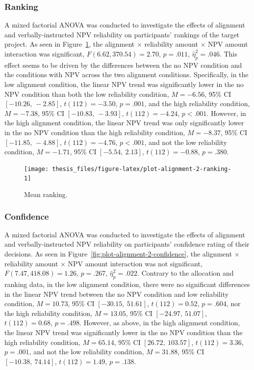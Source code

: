 \documentclass[a4paper, nobind, dvipsnames]{templates/ociamthesis}
\theoremstyle{definition}
\theoremstyle{definition}
\theoremstyle{definition}
\theoremstyle{definition}
\theoremstyle{remark}
\begin{document}
\hypertarget{ranking}{%
\subsubsection{Ranking}\label{ranking}}

A mixed factorial ANOVA was conducted to investigate the effects of alignment
and verbally-instructed NPV reliability on participants' rankings of the
target project. As seen in Figure~\ref{fig:plot-alignment-2-ranking}, the
alignment \(\times\) reliability amount \(\times\) NPV amount interaction was
significant,
\(F(6.62, 370.54) = 2.70\), \(p = .011\), \(\hat{\eta}^2_p = .046\). This
effect seems to be driven by the differences between the no NPV condition and
the conditions with NPV across the two alignment conditions. Specifically, in
the low alignment condition, the linear NPV trend was significantly lower in the
no NPV condition than both the low reliability condition,
\(M = -6.56\), 95\% CI \([-10.26,~-2.85]\), \(t(112) = -3.50\), \(p = .001\), and the high
reliability condition, \(M = -7.38\), 95\% CI \([-10.83,~-3.93]\), \(t(112) = -4.24\), \(p < .001\).
However, in the high alignment condition, the linear NPV trend was only
significantly lower in the no NPV condition than the high reliability condition,
\(M = -8.37\), 95\% CI \([-11.85,~-4.88]\), \(t(112) = -4.76\), \(p < .001\), and not the low
reliability condition, \(M = -1.71\), 95\% CI \([-5.54,~2.13]\), \(t(112) = -0.88\), \(p = .380\).



\begin{figure}
\texttt{[image: thesis\_files/figure-latex/plot-alignment-2-ranking-1]} \caption{Mean ranking.}\label{fig:plot-alignment-2-ranking}
\end{figure}

\hypertarget{confidence}{%
\subsubsection{Confidence}\label{confidence}}

A mixed factorial ANOVA was conducted to investigate the effects of alignment
and verbally-instructed NPV reliability on participants' confidence rating of
their decisions. As seen in Figure~\ref{fig:plot-alignment-2-confidence}, the
alignment \(\times\) reliability amount \(\times\) NPV amount interaction was not
significant,
\(F(7.47, 418.08) = 1.26\), \(p = .267\), \(\hat{\eta}^2_p = .022\).
Contrary to the allocation and ranking data, in
the low alignment condition, there were no significant differences in the linear
NPV trend between the no NPV condition and low reliability condition,
\(M = 10.73\), 95\% CI \([-30.15,~51.61]\), \(t(112) = 0.52\), \(p = .604\), nor the high
reliability condition, \(M = 13.05\), 95\% CI \([-24.97,~51.07]\), \(t(112) = 0.68\), \(p = .498\).
However, as above, in the high alignment condition, the linear NPV trend was
significantly lower in the no NPV condition than the high reliability condition,
\(M = 65.14\), 95\% CI \([26.72,~103.57]\), \(t(112) = 3.36\), \(p = .001\), and not the low
reliability condition, \(M = 31.88\), 95\% CI \([-10.38,~74.14]\), \(t(112) = 1.49\), \(p = .138\).
\end{document}
